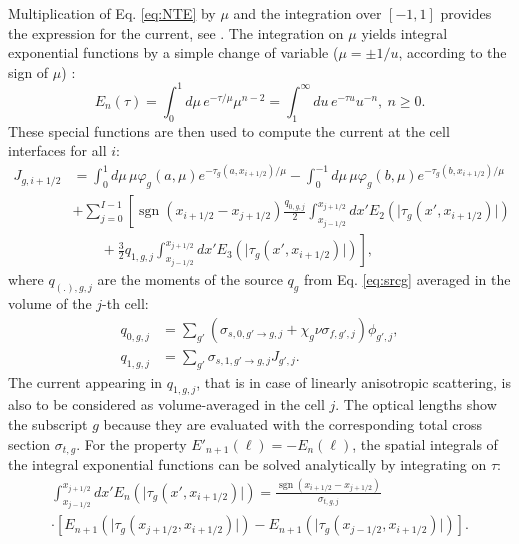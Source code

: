 \documentclass{ictt26}
\DeclareMathOperator{\sign}{sgn}
\begin{document}
Multiplication of Eq. \ref{eq:NTE} by $\mu$ and the integration over $[-1, 1]$ provides the expression for the current, see \cite{tomatis2011application}. The integration on $\mu$ yields integral exponential functions by a simple change of variable ($\mu = \pm 1/u$, according to the sign of $\mu$) \cite{AS1964handbook}:
\begin{equation*}
E_n(\tau) = \int_0^1{d\mu\, e^{-\tau / \mu} \mu^{n-2}} = \int_1^\infty{du\, e^{-\tau u}u^{-n}}, \: n \geq 0.
\end{equation*}
These special functions are then used to compute the current at the cell interfaces for all $i$:
\begin{equation}
\begin{split}
J_{g,i+1/2} &= \int_0^{ 1}{d\mu\, \mu \varphi_g(a, \mu) e^{-\tau_g(a, x_{i+1/2})/\mu}}
             - \int_0^{-1}{d\mu\, \mu \varphi_g(b, \mu) e^{-\tau_g(b, x_{i+1/2})/\mu}}\\
  & + \sum_{j=0}^{I-1} \left[  \sign(x_{i+1/2} - x_{j+1/2}) \frac{q_{0,g,j}}{2} \int_{x_{j-1/2}}^{x_{j+1/2}}{dx' E_{2}\left(\lvert \tau_g(x', x_{i+1/2}) \rvert \right) } \right.\\
  & \left. \qquad+ \frac{3}{2}q_{1,g,j} \int_{x_{j-1/2}}^{x_{j+1/2}}{dx' E_{3}\left(\lvert \tau_g(x', x_{i+1/2}) \rvert \right) }\right],
\end{split}
\label{eq:J_tr}
\end{equation}
where $q_{(.),g,j}$ are the moments of the source $q_g$ from Eq. \ref{eq:srcg} averaged in the volume of the $j$-th cell:
\begin{subequations}
\label{eq:srclg}
\begin{align}
   q_{0,g,j} &= \sum_{g'}\left(\sigma_{s,0,g' \rightarrow g,j} +
                              \chi_g \nu\sigma_{f,g',j}
                        \right) \phi_{g',j},\label{eq:srclg0}\\
   q_{1,g,j} &= \sum_{g'}\sigma_{s,1,g' \rightarrow g,j}J_{g',j}.\label{eq:srclg1}
\end{align}
\end{subequations}
The current appearing in $q_{1,g,j}$, that is in case of linearly anisotropic scattering, is also to be considered as volume-averaged in the cell $j$. The optical lengths show the subscript $g$ because they are evaluated with the corresponding total cross section $\sigma_{t,g}$. For the property $E'_{n+1}(\ell) = -E_n(\ell)$, the spatial integrals of the integral exponential functions can be solved analytically by integrating on $\tau$:
\begin{equation*}
\begin{aligned}
\int_{x_{j-1/2}}^{x_{j+1/2}}{ dx' E_{n}\left(\lvert \tau_g(x', x_{i+1/2}) \rvert \right) } =
\frac{\sign(x_{i+1/2} - x_{j+1/2})}{\sigma_{t,g,j}} \\  \cdot
\left[
  E_{n+1} \left(\lvert \tau_g(x_{j+1/2}, x_{i+1/2}) \rvert \right)
 -E_{n+1} \left(\lvert \tau_g(x_{j-1/2}, x_{i+1/2}) \rvert \right)
\right].
\end{aligned}
\end{equation*}
\end{document}
